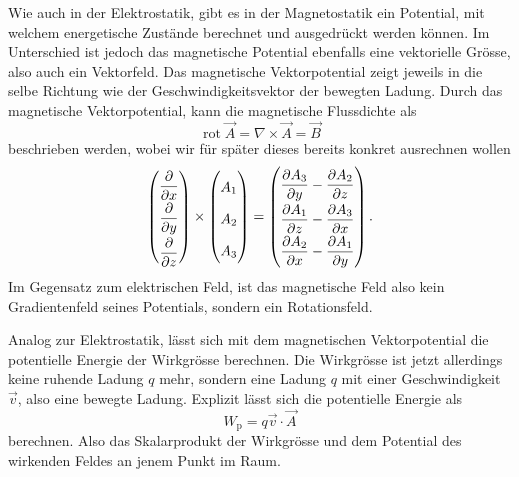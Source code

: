 Wie auch in der Elektrostatik, gibt es in der Magnetostatik ein Potential, mit welchem energetische Zustände berechnet und ausgedrückt werden können. Im Unterschied ist jedoch das magnetische Potential ebenfalls eine vektorielle Grösse, also auch ein Vektorfeld. Das magnetische Vektorpotential zeigt jeweils in die selbe Richtung wie der Geschwindigkeitsvektor der bewegten Ladung.
Durch das magnetische Vektorpotential, kann die magnetische Flussdichte als 
\begin{equation}
	\operatorname{rot}\vec{A}=\nabla \times \vec{A}
	=
	\vec{B}
	\label{maxwell:definitionVektorpot}
\end{equation}
beschrieben werden, wobei wir für später dieses bereits konkret ausrechnen wollen 
\begin{equation}
	\label{maxwell:nablaA}
	\renewcommand{\arraystretch}{1.9}
	\begin{pmatrix}
		\displaystyle
		\frac{\partial}{\partial x} \\
		\displaystyle
		\frac{\partial}{\partial y} \\
		\displaystyle
		\frac{\partial}{\partial z}
	\end{pmatrix}
	\times
	\begin{pmatrix}
		\displaystyle
		A_1 \\
		A_2 \\
		A_3 \\
	\end{pmatrix}
	=
	\begin{pmatrix}
		\displaystyle
		\frac{\partial A_3}{\partial y} -\frac{\partial A_2}{\partial z}\\
		\displaystyle
		\frac{\partial A_1}{\partial z} -\frac{\partial A_3}{\partial x}\\
		\displaystyle
		\frac{\partial A_2}{\partial x} -\frac{\partial A_1}{\partial y}
	\end{pmatrix}.
\end{equation}
Im Gegensatz zum elektrischen Feld, ist das magnetische Feld also kein Gradientenfeld seines Potentials, sondern ein Rotationsfeld.

Analog zur Elektrostatik, lässt sich mit dem magnetischen Vektorpotential die potentielle Energie der Wirkgrösse berechnen. Die Wirkgrösse ist jetzt allerdings keine ruhende Ladung $q$ mehr, sondern eine Ladung $q$ mit einer Geschwindigkeit $\vec{v}$, also eine bewegte Ladung. Explizit lässt sich die potentielle Energie als 
\[ W_{\text{p}} =  q\vec{v}\cdot\vec{A}\]
berechnen. Also das Skalarprodukt der Wirkgrösse und dem Potential des wirkenden Feldes an jenem Punkt im Raum.


